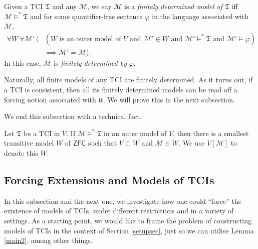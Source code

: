 \documentclass[12pt]{article}
\numberwithin{equation}{section}
\begin{document}
\begin{defi}
Given a TCI $\mathfrak{T}$ and any $\mathcal{M}$, we say $\mathcal{M}$ is a \emph{finitely determined model of} $\mathfrak{T}$ iff $\mathcal{M} \models^* \mathfrak{T}$ and for some quantifier-free sentence $\varphi$ in the language associated with $\mathcal{M}$, 
\begin{align*}
    \forall W \ \forall \mathcal{M}' \ (&(W \text{ is an outer model of } V \text{ and } \mathcal{M}' \in W \text{ and } \mathcal{M}' \models^* \mathfrak{T} \text{ and } \mathcal{M}' \models \varphi) \\ 
    & \implies \mathcal{M}' = \mathcal{M}).
\end{align*}
In this case, $\mathcal{M}$ is \emph{finitely determined by} $\varphi$.
\end{defi}

Naturally, all finite models of any TCI are finitely determined. As it turns out, if a TCI is consistent, then all its finitely determined models can be read off a forcing notion associated with it. We will prove this in the next subsection.

We end this subsection with a technical fact.

\begin{fact}
Let $\mathfrak{T}$ be a TCI in $V$. If $\mathcal{M} \models^* \mathfrak{T}$ in an outer model of $V$, then there is a smallest transitive model $W$ of $\mathsf{ZFC}$ such that $V \subset W$ and $\mathcal{M} \in W$. We use $V[\mathcal{M}]$ to denote this $W$.
\end{fact}

\subsection{Forcing Extensions and Models of TCIs}\label{GOCon}

In this subsection and the next one, we investigate how one could ``force'' the existence of models of TCIs, under different restrictions and in a variety of settings. As a starting point, we would like to frame the problem of constructing models of TCIs in the context of Section \ref{setupsec}, just so we can utilise Lemma \ref{main2}, among other things. 
\end{document}

